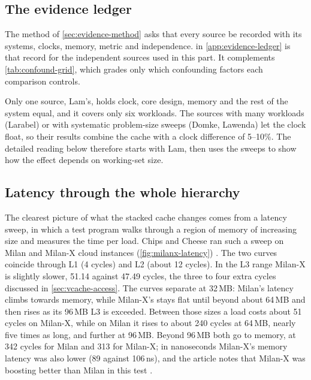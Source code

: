 \subsection{The evidence ledger}
\label{sec:evidence-ledger}
The method of \cref{sec:evidence-method} asks that every source be recorded with its systems, clocks, memory, metric and independence.  in \cref{app:evidence-ledger} is that record for the independent sources used in this part. It complements \cref{tab:confound-grid}, which grades only which confounding factors each comparison controls.

Only one source, Lam's, holds clock, core design, memory and the rest of the system equal, and it covers only six workloads. The sources with many workloads (Larabel) or with systematic problem-size sweeps (Domke, Lawenda) let the clock float, so their results combine the cache with a clock difference of 5--10\%. The detailed reading below therefore starts with Lam, then uses the sweeps to show how the effect depends on working-set size.

\subsection{Latency through the whole hierarchy}
\label{sec:milanx-latency}
The clearest picture of what the stacked cache changes comes from a latency sweep, in which a test program walks through a region of memory of increasing size and measures the time per load. Chips and Cheese ran such a sweep on Milan and Milan-X cloud instances (\cref{fig:milanx-latency}) \cite{cozmaAMDsVCacheTested2022}. The two curves coincide through L1 (4 cycles) and L2 (about 12 cycles). In the L3 range Milan-X is slightly slower, 51.14 against 47.49 cycles, the three to four extra cycles discussed in \cref{sec:vcache-access}. The curves separate at 32\,MB: Milan's latency climbs towards memory, while Milan-X's stays flat until beyond about 64\,MB and then rises as its 96\,MB L3 is exceeded. Between those sizes a load costs about 51 cycles on Milan-X, while on Milan it rises to about 240 cycles at 64\,MB, nearly five times as long, and further at 96\,MB. Beyond 96\,MB both go to memory, at 342 cycles for Milan and 313 for Milan-X; in nanoseconds Milan-X's memory latency was also lower (89 against 106\,ns), and the article notes that Milan-X was boosting better than Milan in this test \cite{cozmaAMDsVCacheTested2022}.

